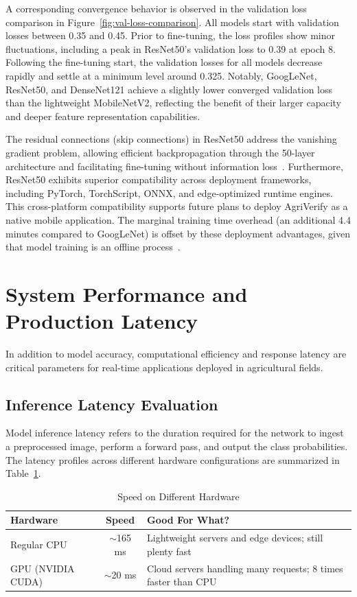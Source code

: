 A corresponding convergence behavior is observed in the validation loss comparison in Figure~\ref{fig:val-loss-comparison}. All models start with validation losses between 0.35 and 0.45. Prior to fine-tuning, the loss profiles show minor fluctuations, including a peak in ResNet50's validation loss to 0.39 at epoch 8. Following the fine-tuning start, the validation losses for all models decrease rapidly and settle at a minimum level around 0.325. Notably, GoogLeNet, ResNet50, and DenseNet121 achieve a slightly lower converged validation loss than the lightweight MobileNetV2, reflecting the benefit of their larger capacity and deeper feature representation capabilities.

The residual connections (skip connections) in ResNet50 address the vanishing gradient problem, allowing efficient backpropagation through the 50-layer architecture and facilitating fine-tuning without information loss~\cite{he2016deep, xu2021}. Furthermore, ResNet50 exhibits superior compatibility across deployment frameworks, including PyTorch, TorchScript, ONNX, and edge-optimized runtime engines. This cross-platform compatibility supports future plans to deploy AgriVerify as a native mobile application. The marginal training time overhead (an additional 4.4 minutes compared to GoogLeNet) is offset by these deployment advantages, given that model training is an offline process~\cite{pytorch2019}.

\section{System Performance and Production Latency}

In addition to model accuracy, computational efficiency and response latency are critical parameters for real-time applications deployed in agricultural fields.

\subsection{Inference Latency Evaluation}

Model inference latency refers to the duration required for the network to ingest a preprocessed image, perform a forward pass, and output the class probabilities. The latency profiles across different hardware configurations are summarized in Table~\ref{tab:latency}.

\begin{table}[htbp]
  \centering
  \caption{Speed on Different Hardware}
  \label{tab:latency}
  \small
  \renewcommand{\arraystretch}{1.1}
  \begin{tabularx}{\textwidth}{|p{4.5cm}|c|X|}
    \hline
    \textbf{Hardware} & \textbf{Speed} & \textbf{Good For What?} \\
    \hline
    Regular CPU & $\sim$165 ms & Lightweight servers and edge devices; still plenty fast \\
    \hline
    GPU (NVIDIA CUDA) & $\sim$20 ms & Cloud servers handling many requests; 8 times faster than CPU \\
    \hline
  \end{tabularx}
\end{table}


